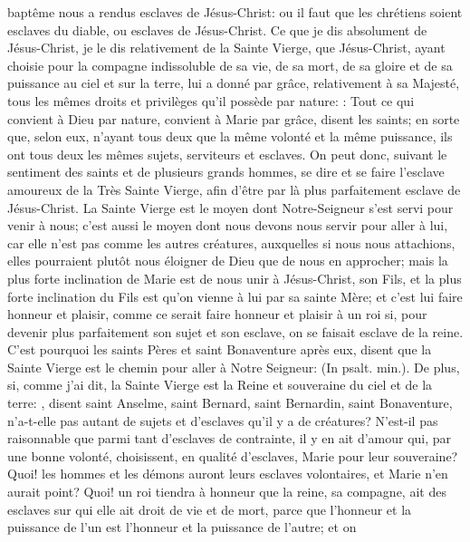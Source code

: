 baptême nous a rendus esclaves de Jésus-Christ: ou il faut que les chrétiens soient esclaves du diable, ou
esclaves de Jésus-Christ.
 Ce que je dis absolument de Jésus-Christ, je le dis relativement de la Sainte Vierge, que Jésus-Christ, ayant
choisie pour la compagne indissoluble de sa vie, de sa mort, de sa gloire et de sa puissance au ciel et sur la terre,
lui a donné par grâce, relativement à sa Majesté, tous les mêmes droits et privilèges qu'il possède par nature:
: Tout ce qui convient à Dieu par nature, convient
à Marie par grâce, disent les saints; en sorte que, selon eux, n'ayant tous deux que la même volonté et la même
puissance, ils ont tous deux les mêmes sujets, serviteurs et esclaves.
 On peut donc, suivant le sentiment des saints et de plusieurs grands hommes, se dire et se faire l'esclave
amoureux de la Très Sainte Vierge, afin d'être par là plus parfaitement esclave de Jésus-Christ. La Sainte Vierge
est le moyen dont Notre-Seigneur s'est servi pour venir à nous; c'est aussi le moyen dont nous devons nous servir
pour aller à lui, car elle n'est pas comme les autres créatures, auxquelles si nous nous attachions, elles pourraient
plutôt nous éloigner de Dieu que de nous en approcher; mais la plus forte inclination de Marie est de nous unir à
Jésus-Christ, son Fils, et la plus forte inclination du Fils est qu'on vienne à lui par sa sainte Mère; et c'est lui faire
honneur et plaisir, comme ce serait faire honneur et plaisir à un roi si, pour devenir plus parfaitement son sujet et
son esclave, on se faisait esclave de la reine. C'est pourquoi les saints Pères et saint Bonaventure après eux,
disent que la Sainte Vierge est le chemin pour aller à Notre Seigneur:  (In psalt. min.).
 De plus, si, comme j'ai dit, la Sainte Vierge est la Reine et souveraine du ciel et de la terre: , disent saint Anselme, saint Bernard,
saint Bernardin, saint Bonaventure, n'a-t-elle pas autant de sujets et d'esclaves qu'il y a de créatures? N'est-il pas
raisonnable que parmi tant d'esclaves de contrainte, il y en ait d'amour qui, par une bonne volonté, choisissent, en
qualité d'esclaves, Marie pour leur souveraine? Quoi! les hommes et les démons auront leurs esclaves volontaires,
et Marie n'en aurait point? Quoi! un roi tiendra à honneur que la reine, sa compagne, ait des esclaves sur qui elle
ait droit de vie et de mort, parce que l'honneur et la puissance de l'un est l'honneur et la puissance de l'autre; et on
